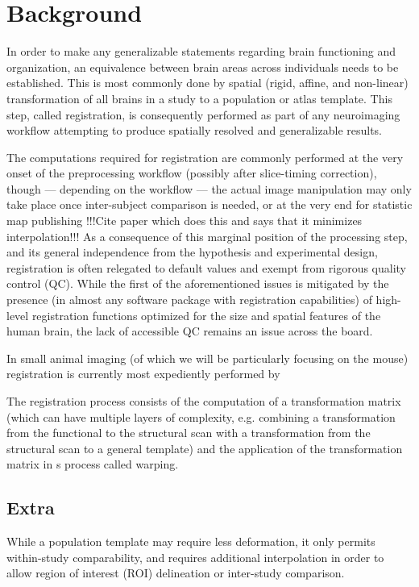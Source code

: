 \section{Background}

In order to make any generalizable statements regarding brain functioning and organization, an equivalence between brain areas across individuals needs to be established.
This is most commonly done by spatial (rigid, affine, and non-linear) transformation of all brains in a study to a population or atlas template.
This step, called registration, is consequently performed as part of any neuroimaging workflow attempting to produce spatially resolved and generalizable results.

The computations required for registration are commonly performed at the very onset of the preprocessing workflow (possibly after slice-timing correction),
though --- depending on the workflow --- the actual image manipulation may only take place once inter-subject comparison is needed, or at the very end for statistic map publishing !!!Cite paper which does this and says that it minimizes interpolation!!!
As a consequence of this marginal position of the processing step, and its general independence from the hypothesis and experimental design, registration is often relegated to default values and exempt from rigorous quality control (QC).
While the first of the aforementioned issues is mitigated by the presence (in almost any software package with registration capabilities) of high-level registration functions optimized for the size and spatial features of the human brain, the lack of accessible QC remains an issue across the board.

In small animal imaging (of which we will be particularly focusing on the mouse) registration is currently most expediently performed by 	

The registration process consists of the computation of a transformation matrix (which can have multiple layers of complexity, e.g. combining a transformation from the functional to the structural scan with a transformation from the structural scan to a general template) and the application of the transformation matrix in s process called warping.

	\subsection{Extra}
	While a population template may require less deformation, it only permits within-study comparability, and requires additional interpolation in order to allow region of interest (ROI) delineation or inter-study comparison.
